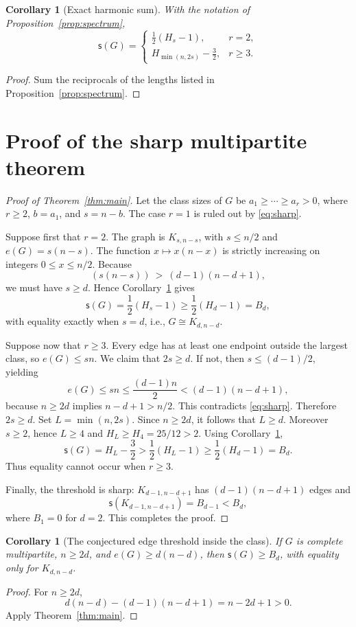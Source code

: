 \documentclass[11pt,letterpaper]{article}
\newtheorem{corollary}[theorem]{Corollary}
\newcommand{\hc}{\mathsf{s}}
\newcommand{\edges}{e}
\begin{document}
\begin{corollary}[Exact harmonic sum]\label{cor:formula}
With the notation of Proposition~\ref{prop:spectrum},
\[
\hc(G)=
\begin{cases}
\frac12(H_s-1),&r=2,\\[3pt]
H_{\min(n,2s)}-\frac32,&r\ge3.
\end{cases}
\]
\end{corollary}
\begin{proof}
Sum the reciprocals of the lengths listed in
Proposition~\ref{prop:spectrum}.
\end{proof}

\section{Proof of the sharp multipartite theorem}
\begin{proof}[Proof of Theorem~\ref{thm:main}]
Let the class sizes of $G$ be $a_1\ge\cdots\ge a_r>0$, where
$r\ge2$, $b=a_1$, and $s=n-b$.  The case $r=1$ is ruled out by
\eqref{eq:sharp}.

Suppose first that $r=2$.  The graph is $K_{s,n-s}$, with
$s\le n/2$ and $\edges(G)=s(n-s)$.  The function
$x\mapsto x(n-x)$ is strictly increasing on integers
$0\le x\le n/2$.
Because
\[
(s(n-s))\ >\ (d-1)(n-d+1),
\]
we must have $s\ge d$.  Hence Corollary~\ref{cor:formula} gives
\[
\hc(G)=\frac12(H_s-1)\ge\frac12(H_d-1)=B_d,
\]
with equality exactly when $s=d$, i.e., $G\cong K_{d,n-d}$.

Suppose now that $r\ge3$.  Every edge has at least one endpoint
outside the largest class, so $\edges(G)\le sn$.
We claim that $2s\ge d$.  If not, then $s\le(d-1)/2$, yielding
\[
\edges(G)\le sn\le\frac{(d-1)n}{2}
 < (d-1)(n-d+1),
\]
because $n\ge2d$ implies $n-d+1>n/2$.
This contradicts \eqref{eq:sharp}.  Therefore $2s\ge d$.
Set $L=\min(n,2s)$.  Since $n\ge2d$, it follows that $L\ge d$.
Moreover $s\ge2$, hence $L\ge4$ and $H_L\ge H_4=25/12>2$.
Using Corollary~\ref{cor:formula},
\[
\hc(G)=H_L-\frac32
>\frac12(H_L-1)\ge\frac12(H_d-1)=B_d.
\]
Thus equality cannot occur when $r\ge3$.

Finally, the threshold is sharp: $K_{d-1,n-d+1}$ has
$(d-1)(n-d+1)$ edges and
\[
\hc(K_{d-1,n-d+1})=B_{d-1}<B_d,
\]
where $B_1=0$ for $d=2$.  This completes the proof.
\end{proof}

\begin{corollary}[The conjectured edge threshold inside the class]\label{cor:target}
If $G$ is complete multipartite, $n\ge2d$, and
$\edges(G)\ge d(n-d)$, then $\hc(G)\ge B_d$,
with equality only for $K_{d,n-d}$.
\end{corollary}
\begin{proof}
For $n\ge2d$,
\[
d(n-d)-(d-1)(n-d+1)=n-2d+1>0.
\]
Apply Theorem~\ref{thm:main}.
\end{proof}
\end{document}
